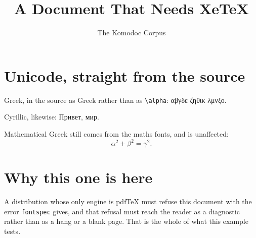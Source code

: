 \documentclass[11pt]{article}
\title{A Document That Needs XeTeX}
\author{The Komodoc Corpus}
\date{}
\begin{document}
\maketitle

\section{Unicode, straight from the source}

Greek, in the source as Greek rather than as \verb|\alpha|: αβγδε ζηθικ λμνξο.

Cyrillic, likewise: Привет, мир.

Mathematical Greek still comes from the maths fonts, and is unaffected:
\begin{equation}
  \alpha^{2} + \beta^{2} = \gamma^{2}.
\end{equation}

\section{Why this one is here}

A distribution whose only engine is pdfTeX must refuse this document with the
error \verb|fontspec| gives, and that refusal must reach the reader as a
diagnostic rather than as a hang or a blank page. That is the whole of what
this example tests.
\end{document}

